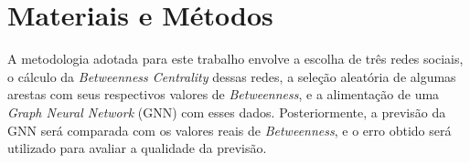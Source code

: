 \documentclass[12pt]{article}
\begin{document}





     
         
    
    

\section{Materiais e Métodos}

A metodologia adotada para este trabalho envolve a escolha de três redes sociais, o cálculo da \textit{Betweenness Centrality} dessas redes, a seleção aleatória de algumas arestas com seus respectivos valores de \textit{Betweenness}, e a alimentação de uma \textit{Graph Neural Network} (GNN) com esses dados. Posteriormente, a previsão da GNN será comparada com os valores reais de \textit{Betweenness}, e o erro obtido será utilizado para avaliar a qualidade da previsão.
\end{document}
